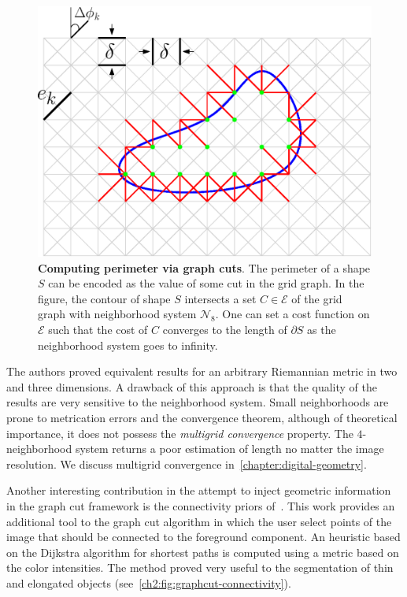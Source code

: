 \begin{figure}
\center
\includegraphics[scale=0.5]{figures/chapter2/perimeter-graph-cuts/geodesics.eps}
\caption{\textbf{Computing perimeter via graph cuts}. The perimeter of a shape $S$ can be encoded as the value of some cut in the grid graph. In the figure, the contour of shape $S$ intersects a set $C \in \mathcal{E}$ of the grid graph with neighborhood system $\mathcal{N}_8$. One can set a cost function on $\mathcal{E}$ such that the cost of $C$ converges to the length of $\partial S$ as the neighborhood system goes to infinity.}
\label{ch2:fig:geodesic-grid-graph-shape-intersection}
\end{figure}

The authors proved equivalent results for an arbitrary Riemannian metric in two and three dimensions. A drawback of this approach is that the quality of the results are very sensitive to the neighborhood system. Small neighborhoods are prone to metrication errors and the convergence theorem, although of theoretical importance, it does not possess the \emph{multigrid convergence} property. The $4$-neighborhood system returns a poor estimation of length no matter the image resolution. We discuss multigrid convergence in~\cref{chapter:digital-geometry}.

Another interesting contribution in the attempt to inject geometric information in the graph cut framework is the connectivity priors of~\cite{vicente08graph}. This work provides an additional tool to the graph cut algorithm in which the user select points of the image that should be connected to the foreground component. An heuristic based on the Dijkstra algorithm for shortest paths is computed using a metric based on the color intensities. The method proved very useful to the segmentation of thin and elongated objects (see~\cref{ch2:fig:graphcut-connectivity}).

